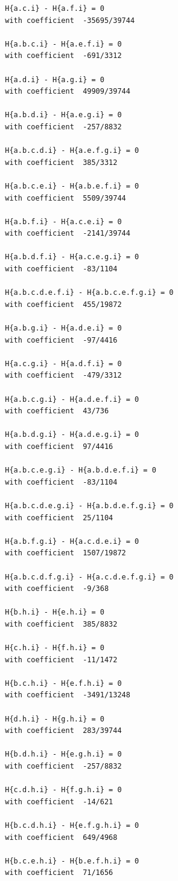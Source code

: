 \documentclass[11pt, a4paper]{kybernetika}
\begin{document}
\begin{verbatim}
		H{a.c.i} - H{a.f.i} = 0
		with coefficient  -35695/39744
		
		H{a.b.c.i} - H{a.e.f.i} = 0
		with coefficient  -691/3312
		
		H{a.d.i} - H{a.g.i} = 0
		with coefficient  49909/39744
		
		H{a.b.d.i} - H{a.e.g.i} = 0
		with coefficient  -257/8832
		
		H{a.b.c.d.i} - H{a.e.f.g.i} = 0
		with coefficient  385/3312
		
		H{a.b.c.e.i} - H{a.b.e.f.i} = 0
		with coefficient  5509/39744
		
		H{a.b.f.i} - H{a.c.e.i} = 0
		with coefficient  -2141/39744
		
		H{a.b.d.f.i} - H{a.c.e.g.i} = 0
		with coefficient  -83/1104
		
		H{a.b.c.d.e.f.i} - H{a.b.c.e.f.g.i} = 0
		with coefficient  455/19872
		
		H{a.b.g.i} - H{a.d.e.i} = 0
		with coefficient  -97/4416
		
		H{a.c.g.i} - H{a.d.f.i} = 0
		with coefficient  -479/3312
		
		H{a.b.c.g.i} - H{a.d.e.f.i} = 0
		with coefficient  43/736
		
		H{a.b.d.g.i} - H{a.d.e.g.i} = 0
		with coefficient  97/4416
		
		H{a.b.c.e.g.i} - H{a.b.d.e.f.i} = 0
		with coefficient  -83/1104
		
		H{a.b.c.d.e.g.i} - H{a.b.d.e.f.g.i} = 0
		with coefficient  25/1104
		
		H{a.b.f.g.i} - H{a.c.d.e.i} = 0
		with coefficient  1507/19872
		
		H{a.b.c.d.f.g.i} - H{a.c.d.e.f.g.i} = 0
		with coefficient  -9/368
		
		H{b.h.i} - H{e.h.i} = 0
		with coefficient  385/8832
		
		H{c.h.i} - H{f.h.i} = 0
		with coefficient  -11/1472
		
		H{b.c.h.i} - H{e.f.h.i} = 0
		with coefficient  -3491/13248
		
		H{d.h.i} - H{g.h.i} = 0
		with coefficient  283/39744
		
		H{b.d.h.i} - H{e.g.h.i} = 0
		with coefficient  -257/8832
		
		H{c.d.h.i} - H{f.g.h.i} = 0
		with coefficient  -14/621
		
		H{b.c.d.h.i} - H{e.f.g.h.i} = 0
		with coefficient  649/4968
		
		H{b.c.e.h.i} - H{b.e.f.h.i} = 0
		with coefficient  71/1656
		

\end{verbatim}
\end{document}
